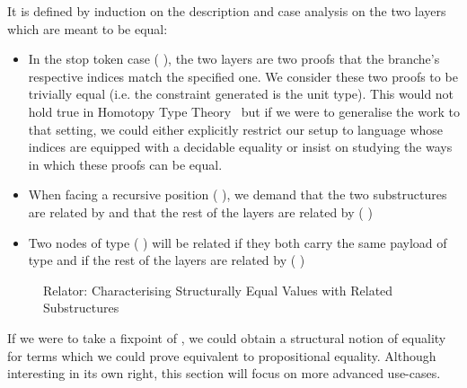 It is defined by induction on the description and case analysis on the two
layers which are meant to be equal:
\begin{itemize}
\item In the stop token case {( )}, the two layers are two proofs
    that the branche's respective indices match the specified one. We consider
    these two proofs to be trivially equal (i.e. the constraint generated is the
    unit type).
    This would not hold true in Homotopy Type Theory~\cite{hottbook}
    but if we were to generalise the work to that setting, we could either explicitly
    restrict our setup to language whose indices are equipped with a decidable equality
    or insist on studying the ways in which these proofs can be equal.
  \item When facing a recursive position {(   )}, we
    demand that the two substructures are related by {  }
    and that the rest of the layers are related by (   )
  \item Two nodes of type {(  )} will
    be related if they both carry the same payload  of type  and if
    the rest of the layers are related by (    )
\end{itemize}

\begin{figure}[h]
\caption{Relator: Characterising Structurally Equal Values with Related Substructures\label{fig:zip-rel}}
\end{figure}

If we were to take a fixpoint of , we could obtain a structural
notion of equality for terms which we could prove equivalent to propositional
equality. Although interesting in its own right, this section will focus
on more advanced use-cases.




